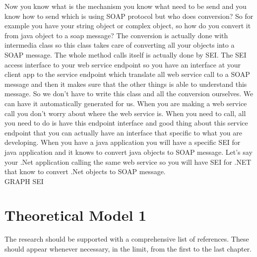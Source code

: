 Now you know what is the mechanism you know what need to be send and you know how to send which is using SOAP protocol
but who does conversion? So for example you have your string object or complex object, so how do you convert it from java
object to a soap message? The conversion is actually done with intermedia class so this class takes care of converting all
your objects into a SOAP message. The whole method calls itself is actually done by SEI. The SEI access interface to your
web service endpoint so you have an interface at your client app to the service endpoint which translate all web service
call to a SOAP message and then it makes sure that the other things is able to understand this message. So we don’t have to
write this class and all the conversion ourselves. We can have it automatically generated for us. When you are making a web
service call you don’t worry about where the web service is. When you need to call, all you need to do is have this endpoint
interface and good thing about this service endpoint that you can actually have an interface that specific to what you are
developing. When you have a java application you will have a specific SEI for java application and it knows to convert java
objects to SOAP message. Let’s say your .Net application calling the same web service so you will have SEI for .NET that know
to convert .Net objects to SOAP message.\\

GRAPH SEI\\


\section{Theoretical Model 1}
\label{section:theory1}

The research should be supported with a comprehensive list of references.
These should appear whenever necessary, in the limit, from the first to the last chapter.


